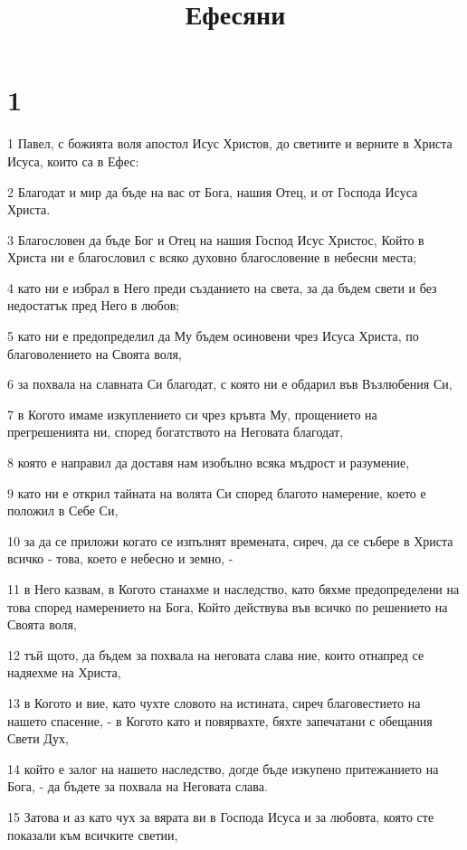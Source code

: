 

\title{Ефесяни}


\chapter{1}

\par 1 Павел, с божията воля апостол Исус Христов, до светиите и верните в Христа Исуса, които са в Ефес:
\par 2 Благодат и мир да бъде на вас от Бога, нашия Отец, и от Господа Исуса Христа.
\par 3 Благословен да бъде Бог и Отец на нашия Господ Исус Христос, Който в Христа ни е благословил с всяко духовно благословение в небесни места;
\par 4 като ни е избрал в Него преди създанието на света, за да бъдем свети и без недостатък пред Него в любов;
\par 5 като ни е предопределил да Му бъдем осиновени чрез Исуса Христа, по благоволението на Своята воля,
\par 6 за похвала на славната Си благодат, с която ни е обдарил във Възлюбения Си,
\par 7 в Когото имаме изкуплението си чрез кръвта Му, прощението на прегрешенията ни, според богатството на Неговата благодат,
\par 8 която е направил да доставя нам изобълно всяка мъдрост и разумение,
\par 9 като ни е открил тайната на волята Си според благото намерение, което е положил в Себе Си,
\par 10 за да се приложи когато се изпълнят времената, сиреч, да се събере в Христа всичко - това, което е небесно и земно, -
\par 11 в Него казвам, в Когото станахме и наследство, като бяхме предопределени на това според намерението на Бога, Който действува във всичко по решението на Своята воля,
\par 12 тъй щото, да бъдем за похвала на неговата слава ние, които отнапред се надяехме на Христа,
\par 13 в Когото и вие, като чухте словото на истината, сиреч благовестието на нашето спасение, - в Когото като и повярвахте, бяхте запечатани с обещания Свети Дух,
\par 14 който е залог на нашето наследство, догде бъде изкупено притежанието на Бога, - да бъдете за похвала на Неговата слава.
\par 15 Затова и аз като чух за вярата ви в Господа Исуса и за любовта, която сте показали към всичките светии,

